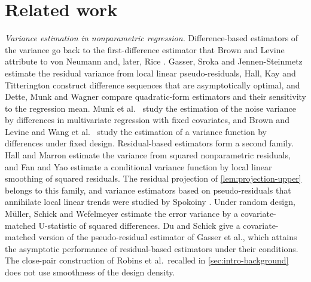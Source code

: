 \section{Related work}\label{sec:intro-related}

\emph{Variance estimation in nonparametric regression.} Difference-based
estimators of the variance go back to the first-difference estimator that
Brown and Levine \cite[Section~1]{BrownLevine2007} attribute to
von Neumann and, later, Rice \cite{Rice1984}. Gasser, Sroka and Jennen-Steinmetz \cite{GasserEtAl1986}
estimate the residual variance from local linear pseudo-residuals, Hall,
Kay and Titterington \cite{HallEtAl1990} construct difference
sequences that are asymptotically optimal, and Dette, Munk and Wagner
\cite{DetteEtAl1998} compare quadratic-form estimators and their
sensitivity to the regression mean. Munk et al.\ \cite{MunkEtAl2005}
study the estimation of the noise variance by differences in
multivariate regression with fixed covariates, and Brown and Levine
\cite{BrownLevine2007} and Wang et al.\ \cite{WangBrownCaiLevine2008}
study the estimation of a variance function by differences under fixed
design. Residual-based estimators form a second family. Hall and Marron
\cite{HallMarron1990} estimate the variance from squared nonparametric
residuals, and Fan and Yao \cite{FanYao1998} estimate a conditional
variance function by local linear smoothing of squared residuals. The
residual projection of \cref{lem:projection-upper} belongs to this
family, and variance estimators based on pseudo-residuals that
annihilate local linear trends were studied by Spokoiny
\cite[Sections~2.1--2.2]{Spokoiny2002}. Under random design, M\"uller,
Schick and Wefelmeyer \cite{MullerEtAl2003} estimate the error variance
by a covariate-matched U-statistic of squared differences. Du and
Schick \cite{DuSchick2009} give a covariate-matched version of the
pseudo-residual estimator of Gasser et al., which attains the
asymptotic performance of residual-based estimators under their
conditions. The close-pair construction of Robins et al.\ recalled in
\cref{sec:intro-background} does not use smoothness of the design
density.

